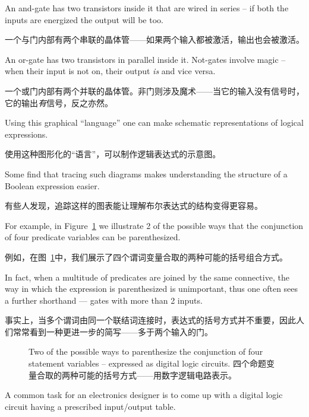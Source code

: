 \begin{center}

\end{center}

An and-gate has two transistors inside it that are wired in series -- 
if both the inputs are energized the output will be too.

一个与门内部有两个串联的晶体管——如果两个输入都被激活，输出也会被激活。

An
or-gate has two transistors in parallel inside it.  Not-gates 
involve magic -- when their input is not on, their output \emph{is}
and vice versa.

一个或门内部有两个并联的晶体管。非门则涉及魔术——当它的输入没有信号时，它的输出\emph{有}信号，反之亦然。

Using this graphical ``language'' one can make schematic 
representations of logical expressions.

使用这种图形化的“语言”，可以制作逻辑表达式的示意图。

Some find that 
tracing such diagrams makes understanding the structure 
of a Boolean expression easier.

有些人发现，追踪这样的图表能让理解布尔表达式的结构变得更容易。

For example, in Figure~\ref{fig:3ands}
we illustrate 2 of the possible ways that the conjunction
of four predicate variables can be parenthesized.

例如，在图~\ref{fig:3ands}中，我们展示了四个谓词变量合取的两种可能的括号组合方式。

In fact, when
a multitude of predicates are joined by the same connective,
the way in which the expression is parenthesized is unimportant,
thus one often sees a further shorthand --- gates with more than
2 inputs.

事实上，当多个谓词由同一个联结词连接时，表达式的括号方式并不重要，因此人们常常看到一种更进一步的简写——多于两个输入的门。

\begin{figure}[!hbtp] 
\centerline{}
\caption[Parenthesizations expressed as digital logic circuits.用数字逻辑电路表示括号方式]{%
Two of the possible ways to parenthesize the conjunction %
of four statement variables -- expressed as digital logic circuits. 四个命题变量合取的两种可能的括号方式——用数字逻辑电路表示。}
\label{fig:3ands}
\end{figure}

A common task for an electronics designer is to come up with
a digital logic circuit having a prescribed input/output table.

